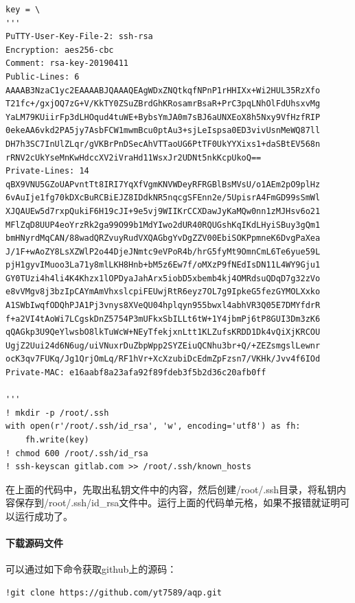 \documentclass{article}
\begin{document}
\begin{lstlisting}
key = \
'''
PuTTY-User-Key-File-2: ssh-rsa
Encryption: aes256-cbc
Comment: rsa-key-20190411
Public-Lines: 6
AAAAB3NzaC1yc2EAAAABJQAAAQEAgWDxZNQtkqfNPnP1rHHIXx+Wi2HUL35RzXfo
T21fc+/gxjOQ7zG+V/KkTY0ZSuZBrdGhKRosamrBsaR+PrC3pqLNhOlFdUhsxvMg
YaLM79KUiirFp3dLHOqud4tuWE+BybsYmJA0m7sBJ6aUNXEoX8h5Nxy9VfHzfRIP
0ekeAA6vkd2PA5jy7AsbFCW1mwmBcu0ptAu3+sjLeIspsa0ED3vivUsnMeWQ87ll
DH7h3SC7InUlZLqr/gVKBrPnDSecAhVTTaoUG6PtTF0UkYYXixs1+daSBtEV568n
rRNV2cUkYseMnKwHdccXV2iVraHd11WsxJr2UDNt5nkKcpUkoQ==
Private-Lines: 14
qBX9VNU5GZoUAPvntTt8IRI7YqXfVgmKNVWDeyRFRGBlBsMVsU/o1AEm2pO9plHz
6vAuIje1fg70kDXcBuRCBiEJZ8IDdkNR5nqcgSFEnn2e/5UpisrA4FmGD99sSmWl
XJQAUEw5d7rxpQukiF6H19cJI+9e5vj9WIIKrCCXDawJyKaMQw0nn1zMJHsv6o21
MFlZqD8UUP4eoYrzRk2ga99O99b1MdYIwo2dUR40RQUGshKqIKdLHyiSBuy3gQm1
bmHNyrdMqCAN/88wadQRZvuyRudVXQAGbgYvDgZZV00EbiSOKPpmneK6DvgPaXea
J/1F+wAoZY8LsXZWlP2o44DjeJNmtc9eVPoR4b/hrG5fyMt9OmnCmL6Te6yue59L
pjH1gyvIMuoo3La71y8mlLKH8Hnb+bM5z6Ew7f/oMXzP9fNEdIsDN11L4WY9Gju1
GY0TUzi4h4li4K4Khzx1lOPDyaJahArx5iobD5xbemb4kj4OMRdsuQDqD7g32zVo
e8vVMgv8j3bzIpCAYmAmVhxslcpiFEUwjRtR6eyz7OL7g9IpkeG5fezGYMOLXxko
A1SWbIwqfODQhPJA1Pj3vnys8XVeQU04hplqyn955bwxl4abhVR3Q05E7DMYfdrR
f+a2VI4tAoWi7LCgskDnZ5754P3mUFkxSbILLt6tW+1Y4jbmPj6tP8GUI3Dm3zK6
qQAGkp3U9QeYlwsbO8lkTuWcW+NEyTfekjxnLtt1KLZufsKRDD1Dk4vQiXjKRCOU
UgjZ2Uui24d6N6ug/uiVNuxrDuZbpWpp2SYZEiuQCNhu3br+Q/+ZEZsmgslLewnr
ocK3qv7FUKq/Jg1QrjOmLq/RF1hVr+XcXzubiDcEdmZpFzsn7/VKHk/Jvv4f6IOd
Private-MAC: e16aabf8a23afa92f89fdeb3f5b2d36c20afb0ff

'''
! mkdir -p /root/.ssh
with open(r'/root/.ssh/id_rsa', 'w', encoding='utf8') as fh:
    fh.write(key)
! chmod 600 /root/.ssh/id_rsa
! ssh-keyscan gitlab.com >> /root/.ssh/known_hosts
\end{lstlisting}
在上面的代码中，先取出私钥文件中的内容，然后创建/root/.ssh目录，将私钥内容保存到/root/.ssh/id\_rsa文件中。运行上面的代码单元格，如果不报错就证明可以运行成功了。
\paragraph{下载源码文件}
可以通过如下命令获取github上的源码：
\lstset{language=BASH}
\begin{lstlisting}
!git clone https://github.com/yt7589/aqp.git
\end{lstlisting}
\end{document}
